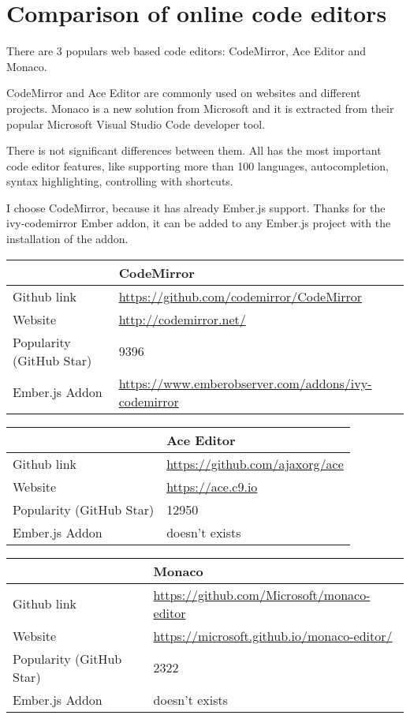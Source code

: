 \section{Comparison of online code editors}

There are 3 populars web based code editors: CodeMirror, Ace Editor and Monaco.

CodeMirror and Ace Editor are commonly used on websites and different projects. Monaco is a new solution from Microsoft and it is extracted from their popular Microsoft Visual Studio Code developer tool.

There is not significant differences between them. All has the most important code editor features, like supporting more than 100 languages, autocompletion, syntax highlighting, controlling with shortcuts.

I choose CodeMirror, because it has already Ember.js support. Thanks for the ivy-codemirror Ember addon, it can be added to any Ember.js project with the installation of the addon.

\begin{tabular}{| l | l |}
\hline
& CodeMirror \\
\hline
Github link & \url{https://github.com/codemirror/CodeMirror} \\
\hline
Website & \url{http://codemirror.net/} \\
\hline
Popularity (GitHub Star) & 9396 \\
\hline
Ember.js Addon & \url{https://www.emberobserver.com/addons/ivy-codemirror} \\
\hline
\end{tabular}

\begin{tabular}{| l | l |}
\hline
& Ace Editor \\
\hline
Github link & \url{https://github.com/ajaxorg/ace} \\
\hline
Website & \url{https://ace.c9.io} \\
\hline
Popularity (GitHub Star) & 12950 \\
\hline
Ember.js Addon & doesn't exists \\
\hline
\end{tabular}

\begin{tabular}{| l | l |}
\hline
& Monaco \\
\hline
Github link & \url{https://github.com/Microsoft/monaco-editor} \\
\hline
Website & \url{https://microsoft.github.io/monaco-editor/} \\
\hline
Popularity (GitHub Star) & 2322 \\
\hline
Ember.js Addon & doesn't exists \\
\hline
\end{tabular}



